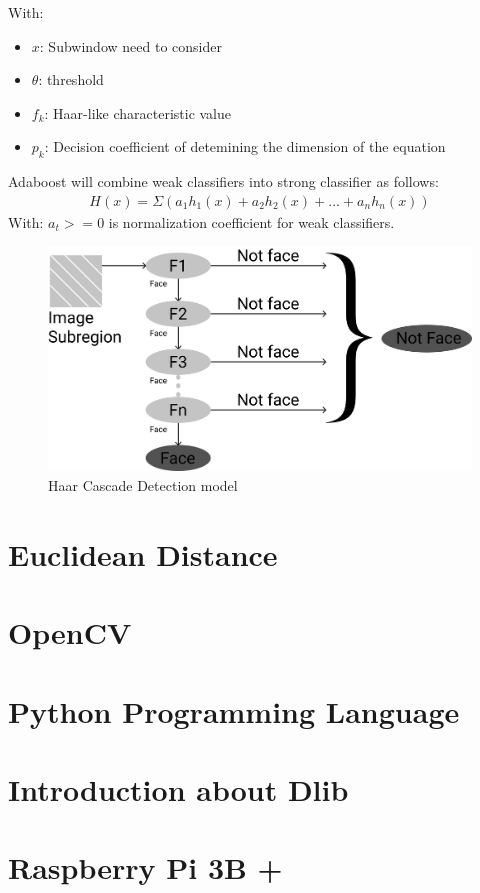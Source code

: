             With: 
            \begin{itemize}
                \item $x$: Subwindow need to consider
                \item $\theta$: threshold
                \item $f_k$: Haar-like characteristic value
                \item $p_k$: Decision coefficient of detemining the dimension of the equation
            \end{itemize}
            Adaboost will combine weak classifiers into strong classifier as follows:
            \begin{align}
                H(x) = \Sigma(a_1 h_1(x) + a_2 h_2(x) +...+ a_n h_n(x))
            \end{align}
            With: $a_t >= 0$ is normalization coefficient for weak classifiers.
            \begin{figure}[H]
                \centering
                \includegraphics[width=0.6\linewidth]{img/Haar-Cascade.png}
                \caption{Haar Cascade Detection model}
            \end{figure}

\section{Euclidean Distance}

\section{OpenCV}

\section{Python Programming Language}

\section{Introduction about Dlib}

\section{Raspberry Pi 3B +}